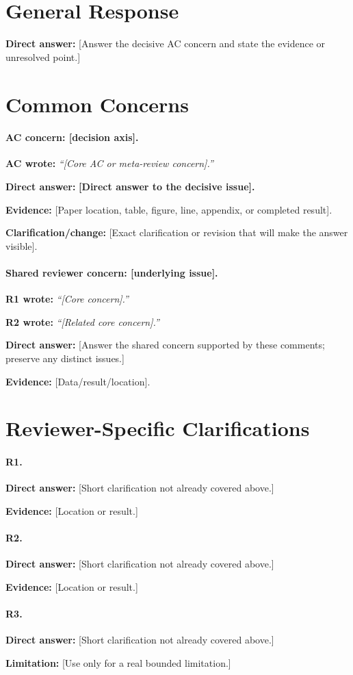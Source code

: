 \documentclass[10pt]{article}
\newcommand{\rlabel}[2]{\textbf{\textcolor{#1}{#2}}}
\newcommand{\quotedconcern}[3]{\par\noindent\textcolor{#1}{\textbf{#2 wrote:}} \emph{``#3''}\par}
\newcommand{\directanswer}[1]{\par\noindent\textbf{Direct answer:} #1\par}
\newcommand{\evidence}[1]{\par\noindent\textbf{Evidence:} #1\par}
\newcommand{\change}[1]{\par\noindent\textbf{Clarification/change:} #1\par}
\newcommand{\limitation}[1]{\par\noindent\textbf{Limitation:} #1\par}
\begin{document}
\section*{General Response}

\directanswer{[Answer the decisive AC concern and state the evidence or unresolved point.]}

\section*{Common Concerns}

\paragraph{AC concern: [decision axis].}
\quotedconcern{accolor}{AC}{[Core AC or meta-review concern].}
\directanswer{\textbf{[Direct answer to the decisive issue].}}
\evidence{[Paper location, table, figure, line, appendix, or completed result].}
\change{[Exact clarification or revision that will make the answer visible].}

\paragraph{Shared reviewer concern: [underlying issue].}
\quotedconcern{revone}{R1}{[Core concern].}
\quotedconcern{revtwo}{R2}{[Related core concern].}
\directanswer{[Answer the shared concern supported by these comments; preserve any distinct issues.]}
\evidence{[Data/result/location].}

\section*{Reviewer-Specific Clarifications}

\paragraph{\rlabel{revone}{R1}.}
\directanswer{[Short clarification not already covered above.]}
\evidence{[Location or result.]}

\paragraph{\rlabel{revtwo}{R2}.}
\directanswer{[Short clarification not already covered above.]}
\evidence{[Location or result.]}

\paragraph{\rlabel{revthree}{R3}.}
\directanswer{[Short clarification not already covered above.]}
\limitation{[Use only for a real bounded limitation.]}
\end{document}
